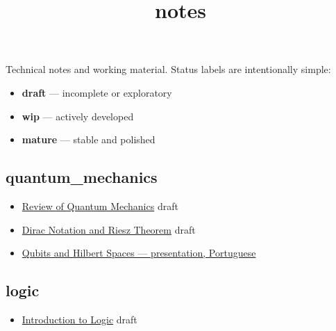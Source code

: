 \documentclass[
]{article}
\title{notes}
\author{}
\date{}
\providecommand{\tightlist}{%
  \setlength{\itemsep}{0pt}\setlength{\parskip}{0pt}}
\begin{document}
\maketitle


Technical notes and working material. Status labels are intentionally
simple:

\begin{itemize}
\tightlist
\item
  \textbf{draft} --- incomplete or exploratory
\item
  \textbf{wip} --- actively developed
\item
  \textbf{mature} --- stable and polished
\end{itemize}

\subsection{quantum\_mechanics}\label{quantum_mechanics}

\begin{itemize}
\tightlist
\item
  \href{qm_ii/qm_review.qmd}{Review of Quantum Mechanics} {draft}
\item
  \href{qm-dirac-riesz.md}{Dirac Notation and Riesz Theorem} {draft}
\item
  \href{../files/apresentacao.pdf}{Qubits and Hilbert Spaces ---
  presentation, Portuguese}
\end{itemize}

\subsection{logic}\label{logic}

\begin{itemize}
\tightlist
\item
  \href{logic_intro.md}{Introduction to Logic} {draft}
\end{itemize}
\end{document}
